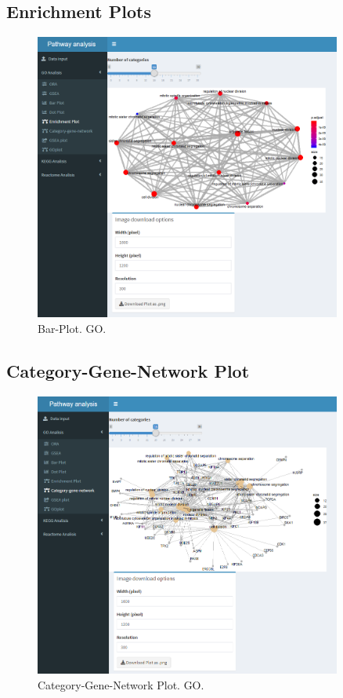 \subsection{Enrichment Plots}

\begin{figure}[H]
\centering
\includegraphics[width=0.9\textwidth]{figures/App_F16_Items_GO_Emap.png} 
\caption{Bar-Plot. GO.}
\end{figure}

\subsection{Category-Gene-Network Plot}

\begin{figure}[H]
\centering
\includegraphics[width=0.9\textwidth]{figures/App_F17_Items_GO_CnetPlot.png} 
\caption{Category-Gene-Network Plot. GO.}
\end{figure}

